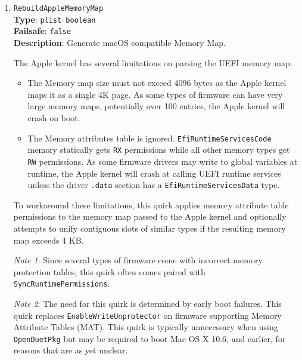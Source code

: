 \documentclass[]{article}
\providecommand{\tightlist}{%
  \setlength{\itemsep}{0pt}\setlength{\parskip}{0pt}}
\begin{document}
\begin{enumerate}
  \emph{Note}: The need for this quirk is determined by random boot failures
  when \texttt{ProvideCustomSlide} is enabled and the randomized slide falls
  into the unavailable range. When \texttt{AppleDebug} is enabled, the
  debug log typically contains messages such as \texttt{AAPL: [EB|`LD:LKC] \} Err(0x9)}.
  To find the optimal value, append \texttt{slide=X}, where \texttt{X} is the slide value,
  to the \texttt{boot-args} and select the largest one that does not result in boot failures.

\item
  \texttt{RebuildAppleMemoryMap}\\
  \textbf{Type}: \texttt{plist\ boolean}\\
  \textbf{Failsafe}: \texttt{false}\\
  \textbf{Description}: Generate macOS compatible Memory Map.

  The Apple kernel has several limitations on parsing the UEFI memory map:

  \begin{itemize}
  \tightlist
  \item The Memory map size must not exceed 4096 bytes as the Apple kernel maps
    it as a single 4K page. As some types of firmware can have very large memory maps,
    potentially over 100 entries, the Apple kernel will crash on boot.
  \item The Memory attributes table is ignored. \texttt{EfiRuntimeServicesCode}
    memory statically gets \texttt{RX} permissions while all other memory types
    get \texttt{RW} permissions. As some firmware drivers may write to global
    variables at runtime, the Apple kernel will crash at calling UEFI runtime services
    unless the driver \texttt{.data} section has a \texttt{EfiRuntimeServicesData}
    type.
  \end{itemize}

  To workaround these limitations, this quirk applies memory attribute table
  permissions to the memory map passed to the Apple kernel and optionally attempts
  to unify contiguous slots of similar types if the resulting memory map exceeds
  4 KB.

  \emph{Note 1}: Since several types of firmware come with incorrect memory protection
  tables, this quirk often comes paired with \texttt{SyncRuntimePermissions}.

  \emph{Note 2}: The need for this quirk is determined by early boot failures.
  This quirk replaces \texttt{EnableWriteUnprotector} on firmware supporting
  Memory Attribute Tables (MAT). This quirk is typically unnecessary when using
  \texttt{OpenDuetPkg} but may be required to boot Mac OS X 10.6, and earlier, for
  reasons that are as yet unclear.


\end{enumerate}
\end{document}
